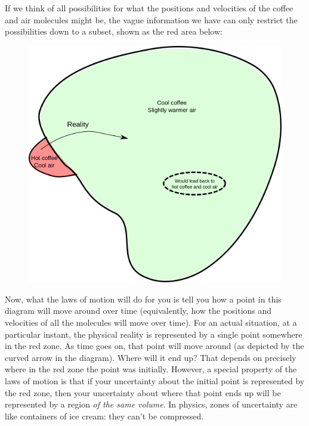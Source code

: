 \documentclass[a4paper, 12pt]{article}
\begin{document}
If we think of all possibilities for what the positions and velocities of the
coffee and air molecules might be, the vague information we have
can only restrict the possibilities down to a subset, shown as the red area
below:

\begin{figure}[ht!]
\centering
\includegraphics[scale=0.6]{diagrams.png}
\end{figure}

Now, what the laws of motion will do for you is tell you how a point in this
diagram will move around over time
(equivalently, how the positions and velocities of all the molecules will
move over time). For an actual situation, at a particular instant, the physical
reality is represented by a single point somewhere in the red zone. As time
goes on, that point will move around (as depicted by the curved arrow in
the diagram). Where will it end up? That depends on precisely where in the
red zone the point was initially. However, a special property of the laws of
motion is that if your uncertainty about the initial point is represented by
the red zone, then your uncertainty about where that point ends up will be
represented by a region {\em of the same volume}.
In physics, zones of uncertainty are
like containers of ice cream: they can't be compressed.
\end{document}
